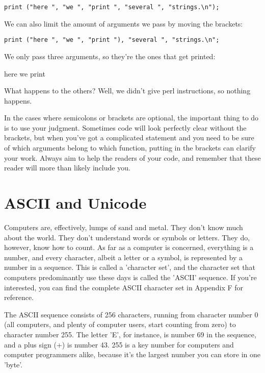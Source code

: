 \documentclass[a4paper,12pt,twoside]{book}
\begin{document}
\noindent 

\noindent \texttt{print ("here ", "we ", "print ", "several ", "strings.\textbackslash n");}

\noindent 

\noindent We can also limit the amount of arguments we pass by moving the brackets:

\noindent 

\noindent \texttt{print ("here ", "we ", "print "), "several ", "strings.\textbackslash n";}

\noindent 

\noindent We only pass three arguments, so they're the ones that get printed:

\noindent 

\noindent here we print

\noindent 

\noindent What happens to the others? Well, we didn't give perl instructions, so nothing happens.

\noindent 

\noindent In the cases where semicolons or brackets are optional, the important thing to do is to use your judgment. Sometimes code will look perfectly clear without the brackets, but when you've got a complicated statement and you need to be sure of which arguments belong to which function, putting in the brackets can clarify your work. Always aim to help the readers of your code, and remember that these reader will more than likely include you.

\noindent 

\section{ASCII and Unicode}

\noindent 

\noindent Computers are, effectively, lumps of sand and metal. They don't know much about the world. They don't understand words or symbols or letters. They do, however, know how to count. As far as a computer is concerned, everything is a number, and every character, albeit a letter or a symbol, is represented by a number in a sequence. This is called a 'character set', and the character set that computers predominantly use these days is called the 'ASCII' sequence. If you're interested, you can find the complete ASCII character set in Appendix F for reference.

\noindent 

\noindent The ASCII sequence consists of 256 characters, running from character number 0 (all computers, and plenty of computer users, start counting from zero) to character number 255. The letter 'E', for instance, is number 69 in the sequence, and a plus sign (+) is number 43. 255 is a key number for computers and computer programmers alike, because it's the largest number you can store in one 'byte'.
\end{document}
